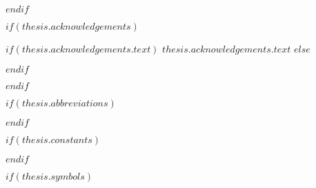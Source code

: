 \begin{abstract}
\addchaptertocentry{\abstractname} %
$abstract$
\end{abstract}

$endif$

$if(thesis.acknowledgements)$

\begin{acknowledgements}
\addchaptertocentry{\acknowledgementname} %
$if(thesis.acknowledgements.text)$
$thesis.acknowledgements.text$
$else$

$endif$
\end{acknowledgements}

$endif$


\begingroup
\hypersetup{linkcolor=$if(toclinkcolor)$$toclinkcolor$$else$black$endif$}

\tableofcontents %

\listoffigures %

\listoftables %

\endgroup


$if(thesis.abbreviations)$



$endif$

$if(thesis.constants)$



$endif$

$if(thesis.symbols)$




